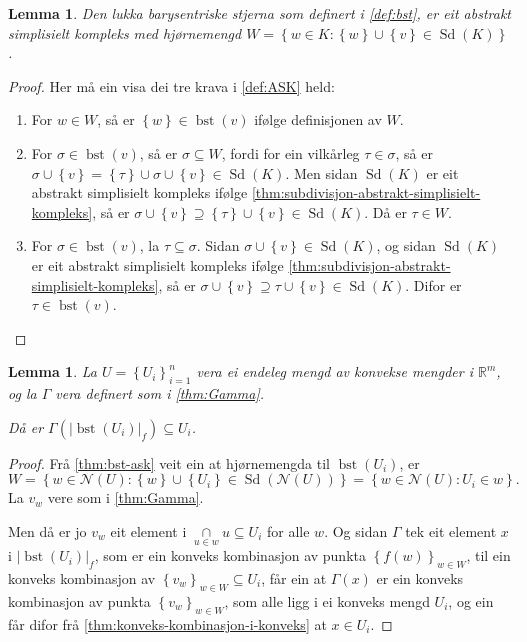 \documentclass[a4paper, 12pt, norsk]{article}
\theoremstyle{plain}
\newtheorem{lemma}[theorem]{Lemma}
\theoremstyle{definition}
\newcommand{\Rb}{\mathbb{R}}
\newcommand{\Nc}{\mathcal{N}}
\newcommand{\intersect}{ \mathop{\cap}\limits }
\newcommand{\union}{ \mathop{\cup}\limits }
\newcommand{\gr}[1]{ \lvert #1 \rvert } %
\newcommand{\set}[1]{ \left\{ #1 \right\} } %
\DeclareMathOperator{\Sd}{Sd} %
\DeclareMathOperator{\bst}{bst} %
\begin{document}
\begin{lemma} \label{thm:bst-ask}
	Den lukka barysentriske stjerna som definert i \autoref{def:bst}, er eit abstrakt simplisielt kompleks med hjørnemengd \( W = \set{w \in K : \set{w} \union \set{v} \in \Sd(K)} \).
\end{lemma}

\begin{proof}
	Her må ein visa dei tre krava i \autoref{def:ASK} held:
	\begin{enumerate}
		\item{For \( w \in W \), så er \( \set{w} \in \bst(v) \) ifølge definisjonen av \( W \).}
  		\item{For \( \sigma \in \bst(v) \), så er \( \sigma \subseteq W \), fordi for ein vilkårleg \( \tau \in \sigma \), så er \( \sigma \union \set{v} = \set{\tau} \union \sigma \union \set{v} \in \Sd(K) \). Men sidan \( \Sd(K) \) er eit abstrakt simplisielt kompleks ifølge \autoref{thm:subdivisjon-abstrakt-simplisielt-kompleks}, så er \( \sigma \union \set{v} \supseteq \set{\tau} \union \set{v} \in \Sd(K) \). Då er \( \tau \in W \).}
    	\item{For \( \sigma \in \bst(v) \), la \( \tau \subseteq \sigma \). Sidan \( \sigma \union \set{v} \in \Sd(K) \), og sidan \( \Sd(K) \) er eit abstrakt simplisielt kompleks ifølge \autoref{thm:subdivisjon-abstrakt-simplisielt-kompleks}, så er \( \sigma \union \set{v} \supseteq \tau \union \set{v} \in \Sd(K) \). Difor er \( \tau \in \bst(v) \).}
	\end{enumerate}
\end{proof}

\begin{lemma} \label{thm:Gamma-inni-ui}
	La \( U = \set{U_i}_{i=1}^n \) vera ei endeleg mengd av konvekse mengder i \( \Rb^m \), og la \( \Gamma \) vera definert som i \autoref{thm:Gamma}.

	Då er \( \Gamma(\gr{\bst(U_i)}_f) \subseteq U_i \).
\end{lemma}

\begin{proof}
	Frå \autoref{thm:bst-ask} veit ein at hjørnemengda til \( \bst(U_i) \), er
	\[
		W = \set{w \in \Nc(U) : \set{w} \union \set{U_i} \in \Sd(\Nc(U))}=\set{w \in \Nc(U) : U_i \in w}.
	\] 
	La \( v_w \) vere som i \autoref{thm:Gamma}.
	
	Men då er jo \( v_w \) eit element i \( \intersect_{u \in w} u \subseteq U_i \) for alle \( w \). Og sidan \( \Gamma \) tek eit element \( x \) i \( \gr{\bst(U_i)}_f \), som er ein konveks kombinasjon av punkta \( \set{f(w)}_{w \in W} \), til ein konveks kombinasjon av \( \set{v_w}_{w \in W} \subseteq U_i \), får ein at \( \Gamma(x) \) er ein konveks kombinasjon av punkta \( \set{v_w}_{w \in W} \), som alle ligg i ei konveks mengd \( U_i \), og ein får difor frå \autoref{thm:konveks-kombinasjon-i-konveks} at \( x \in U_i \).
\end{proof}
\end{document}

